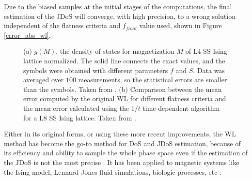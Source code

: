 Due to the biased samples at the initial stages of the computations, the final estimation of the JDoS will converge, with high precision, to a wrong solution independent of the flatness criteria and $f_{final}$ value used, shown in Figure \ref{error_abs_wl}. 

\begin{figure}[ht]
\centering
{}
\quad
{}

\caption{(a) $g(M)$, the density of states for magnetization $M$ of L4 SS Ising lattice normalized. The solid line connects the exact values, and the symbols were obtained with different parameters $f$ and $S$. Data was averaged over $100$ measurements, so the statistical errors are smaller than the symbols. Taken from \cite{Zhou2005}.  (b) Comparison between the mean error computed by the original WL for different flatness criteria and the mean error calculated using the $1/t$ time-dependent algorithm for a L8 SS Ising lattice. Taken from \cite{Belardinelli2007}.}

\end{figure}





Either in its original forms, or using these more recent improvements, the WL method has become the go-to method for DoS and JDoS estimation, because of its efficiency and ability to sample the whole phase space even if the estimation of the JDoS is not the most precise \cite{Zhou2005, Belardinelli2007}. It has been applied to magnetic systems like the Ising model, Lennard-Jones fluid simulations, biologic processes, etc \cite{Maerzke2014, Yan2002,Yan2003}.













